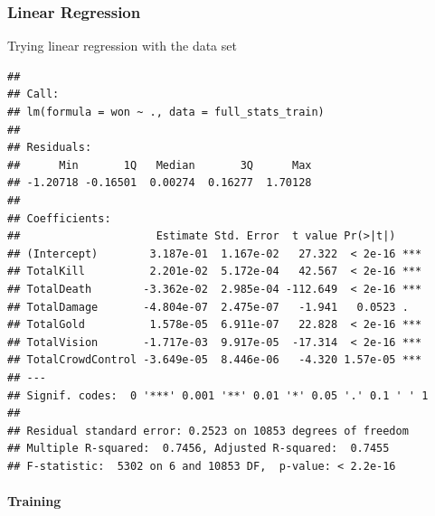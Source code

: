 \documentclass[
]{article}
\newenvironment{Shaded}{\begin{snugshade}}{\end{snugshade}}
\newcommand{\AttributeTok}[1]{\textcolor[rgb]{0.77,0.63,0.00}{#1}}
\newcommand{\DecValTok}[1]{\textcolor[rgb]{0.00,0.00,0.81}{#1}}
\newcommand{\FunctionTok}[1]{\textcolor[rgb]{0.00,0.00,0.00}{#1}}
\newcommand{\NormalTok}[1]{#1}
\newcommand{\OtherTok}[1]{\textcolor[rgb]{0.56,0.35,0.01}{#1}}
\newcommand{\SpecialCharTok}[1]{\textcolor[rgb]{0.00,0.00,0.00}{#1}}
\begin{document}
\hypertarget{linear-regression}{%
\subsubsection{Linear Regression}\label{linear-regression}}

Trying linear regression with the data set

\begin{Shaded}
\end{Shaded}

\begin{verbatim}
## 
## Call:
## lm(formula = won ~ ., data = full_stats_train)
## 
## Residuals:
##      Min       1Q   Median       3Q      Max 
## -1.20718 -0.16501  0.00274  0.16277  1.70128 
## 
## Coefficients:
##                     Estimate Std. Error  t value Pr(>|t|)    
## (Intercept)        3.187e-01  1.167e-02   27.322  < 2e-16 ***
## TotalKill          2.201e-02  5.172e-04   42.567  < 2e-16 ***
## TotalDeath        -3.362e-02  2.985e-04 -112.649  < 2e-16 ***
## TotalDamage       -4.804e-07  2.475e-07   -1.941   0.0523 .  
## TotalGold          1.578e-05  6.911e-07   22.828  < 2e-16 ***
## TotalVision       -1.717e-03  9.917e-05  -17.314  < 2e-16 ***
## TotalCrowdControl -3.649e-05  8.446e-06   -4.320 1.57e-05 ***
## ---
## Signif. codes:  0 '***' 0.001 '**' 0.01 '*' 0.05 '.' 0.1 ' ' 1
## 
## Residual standard error: 0.2523 on 10853 degrees of freedom
## Multiple R-squared:  0.7456, Adjusted R-squared:  0.7455 
## F-statistic:  5302 on 6 and 10853 DF,  p-value: < 2.2e-16
\end{verbatim}

\hypertarget{training}{%
\paragraph{Training}\label{training}}
\end{document}
